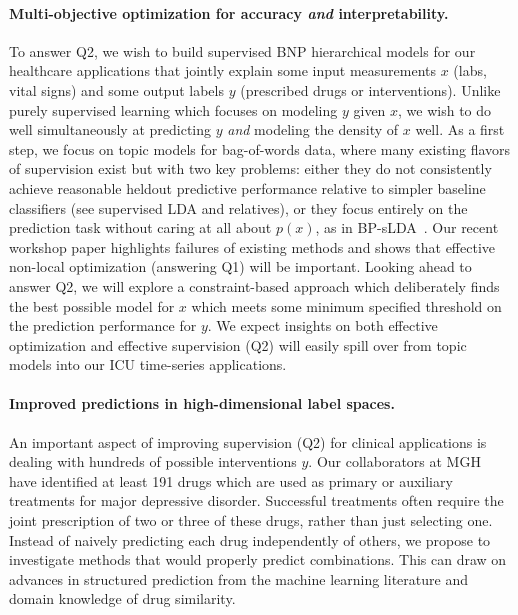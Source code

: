 \documentclass[11pt,letterpaper,sans]{article}
\begin{document}
\paragraph{Multi-objective optimization for accuracy \emph{and} interpretability.}
To answer Q2, we wish to build supervised BNP hierarchical models for our healthcare applications that jointly explain some input measurements $x$ (labs, vital signs) and some output labels $y$ (prescribed drugs or interventions).
Unlike purely supervised learning which focuses on modeling $y$ given $x$, we wish to do well simultaneously at predicting $y$ \emph{and} modeling the density of $x$ well.
As a first step, we focus on topic models for bag-of-words data, where many existing flavors of supervision exist but with two key problems: either they do not consistently achieve reasonable heldout predictive performance relative to simpler baseline classifiers (see supervised LDA \citep{blei2007sLDA} and relatives), or they focus entirely on the prediction task without caring at all about $p(x)$, as in BP-sLDA~\citep{chen2015bplda}. 
Our recent workshop paper
\citep{hughes2016clinicalSLDA} highlights failures of existing methods and shows that effective non-local optimization (answering Q1) will be important. Looking ahead to answer Q2, we will explore a constraint-based approach which deliberately finds the best possible model for $x$ which meets some minimum specified threshold on the prediction performance for $y$. We expect insights on both effective optimization and effective supervision (Q2) will easily spill over from topic models into our ICU time-series applications.


\paragraph{Improved predictions in high-dimensional label spaces.}
An important aspect of improving supervision (Q2) for clinical applications
is dealing with hundreds of possible interventions $y$. Our collaborators at MGH have identified at least 191 drugs which are used as primary or auxiliary treatments for major depressive disorder. Successful treatments often require the joint prescription of two or three of these drugs, rather than just selecting one. 
Instead of naively predicting each drug independently of others, we propose to investigate methods that would properly predict combinations. This can draw on advances in structured prediction from the machine learning literature and domain knowledge of drug similarity.
\end{document}
